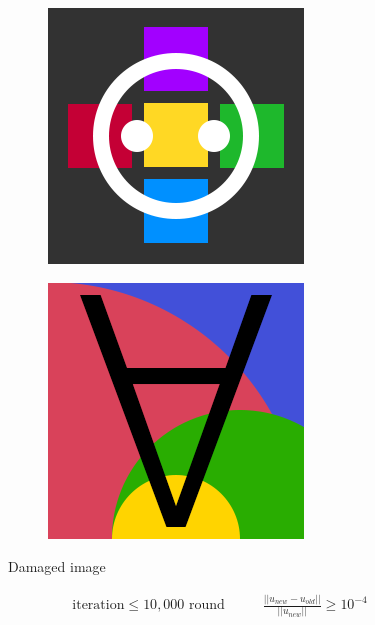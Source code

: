 \documentclass[xcolor=dvipsnames, xetex,serif]{beamer}
\begin{document}
\begin{frame}
\begin{figure}[H]
\begin{subfigure}{0.15\linewidth}
            \end{subfigure}
            \begin{subfigure}{0.15\linewidth}
                \centering
                \includegraphics[width=0.9\linewidth]{images/image_inpaint_synthetic/case04-toinpaint.png}
            \end{subfigure}
            \begin{subfigure}{0.15\linewidth}
                \centering
                \includegraphics[width=0.9\linewidth]{images/image_inpaint_synthetic/case05-toinpaint.png}
            \end{subfigure}
            \caption{Damaged image}
        \end{figure}
        \begin{align*}
            \text{iteration} \leq 10,000 \text{ round } \hspace{1cm}
            \frac{|| u_{new} - u_{old} ||}{|| u_{new} ||} \geq 10^{-4}
        \end{align*}
    \end{frame}
\end{document}
